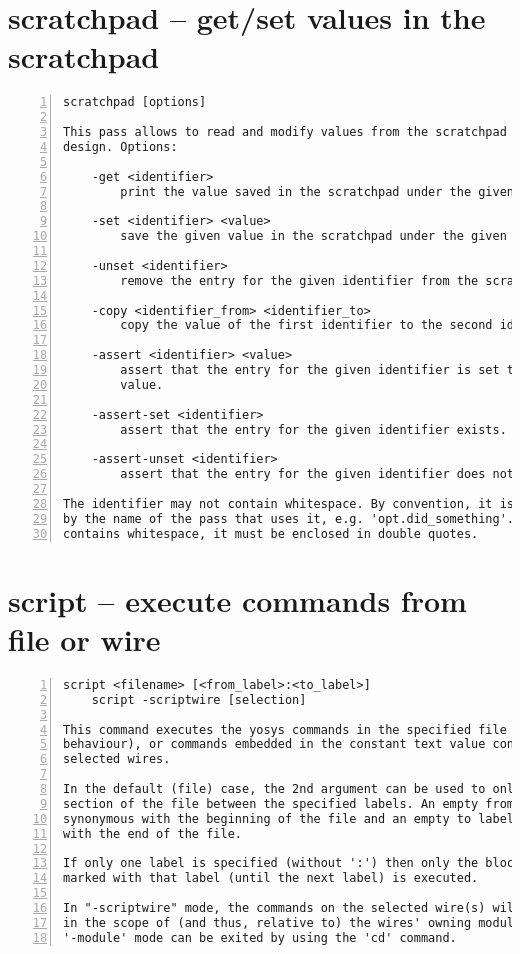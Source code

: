 \section{scratchpad -- get/set values in the scratchpad}
\label{cmd:scratchpad}
\begin{lstlisting}[numbers=left,frame=single]
    scratchpad [options]

This pass allows to read and modify values from the scratchpad of the current
design. Options:

    -get <identifier>
        print the value saved in the scratchpad under the given identifier.

    -set <identifier> <value>
        save the given value in the scratchpad under the given identifier.

    -unset <identifier>
        remove the entry for the given identifier from the scratchpad.

    -copy <identifier_from> <identifier_to>
        copy the value of the first identifier to the second identifier.

    -assert <identifier> <value>
        assert that the entry for the given identifier is set to the given
        value.

    -assert-set <identifier>
        assert that the entry for the given identifier exists.

    -assert-unset <identifier>
        assert that the entry for the given identifier does not exist.

The identifier may not contain whitespace. By convention, it is usually prefixed
by the name of the pass that uses it, e.g. 'opt.did_something'. If the value
contains whitespace, it must be enclosed in double quotes.
\end{lstlisting}

\section{script -- execute commands from file or wire}
\label{cmd:script}
\begin{lstlisting}[numbers=left,frame=single]
    script <filename> [<from_label>:<to_label>]
    script -scriptwire [selection]

This command executes the yosys commands in the specified file (default
behaviour), or commands embedded in the constant text value connected to the
selected wires.

In the default (file) case, the 2nd argument can be used to only execute the
section of the file between the specified labels. An empty from label is
synonymous with the beginning of the file and an empty to label is synonymous
with the end of the file.

If only one label is specified (without ':') then only the block
marked with that label (until the next label) is executed.

In "-scriptwire" mode, the commands on the selected wire(s) will be executed
in the scope of (and thus, relative to) the wires' owning module(s). This
'-module' mode can be exited by using the 'cd' command.
\end{lstlisting}

